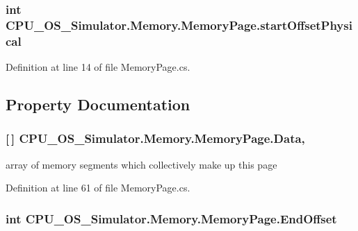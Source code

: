 \subsubsection[{start\+Offset\+Physical}]{\setlength{\rightskip}{0pt plus 5cm}int C\+P\+U\+\_\+\+O\+S\+\_\+\+Simulator.\+Memory.\+Memory\+Page.\+start\+Offset\+Physical\hspace{0.3cm}{\ttfamily [private]}}\label{class_c_p_u___o_s___simulator_1_1_memory_1_1_memory_page_a3cecfb0fe2f91def3db5711180442d44}


Definition at line 14 of file Memory\+Page.\+cs.



\subsection{Property Documentation}
\hypertarget{class_c_p_u___o_s___simulator_1_1_memory_1_1_memory_page_a8bf84e82146f9ff35ffbcc32b93a9db0}{}
\subsubsection[{Data}]{ \mbox{[}$\,$\mbox{]} C\+P\+U\+\_\+\+O\+S\+\_\+\+Simulator.\+Memory.\+Memory\+Page.\+Data\hspace{0.3cm}{\ttfamily [get]}, {\ttfamily [set]}}\label{class_c_p_u___o_s___simulator_1_1_memory_1_1_memory_page_a8bf84e82146f9ff35ffbcc32b93a9db0}


array of memory segments which collectively make up this page 



Definition at line 61 of file Memory\+Page.\+cs.

\hypertarget{class_c_p_u___o_s___simulator_1_1_memory_1_1_memory_page_abe850b4a088a820ecf598af1cd9a7deb}{}
\subsubsection[{End\+Offset}]{\setlength{\rightskip}{0pt plus 5cm}int C\+P\+U\+\_\+\+O\+S\+\_\+\+Simulator.\+Memory.\+Memory\+Page.\+End\+Offset\hspace{0.3cm}{\ttfamily [get]}}\label{class_c_p_u___o_s___simulator_1_1_memory_1_1_memory_page_abe850b4a088a820ecf598af1cd9a7deb}


